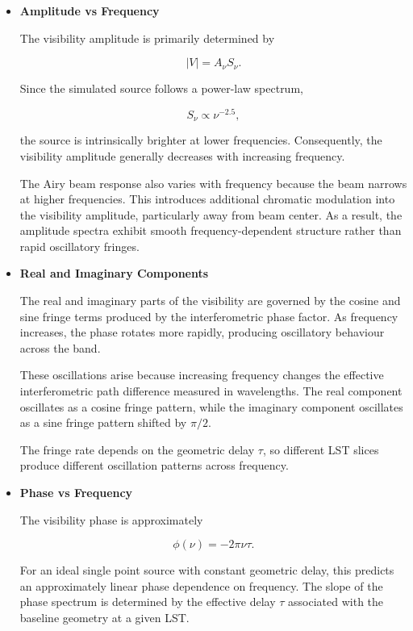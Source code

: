 \documentclass{article}
\begin{document}
\begin{itemize}

\item \textbf{Amplitude vs Frequency}

The visibility amplitude is primarily determined by

\[
|V| = A_\nu S_\nu.
\]

Since the simulated source follows a power-law spectrum,

\[
S_\nu \propto \nu^{-2.5},
\]

the source is intrinsically brighter at lower frequencies. Consequently, the visibility amplitude generally decreases with increasing frequency.

The Airy beam response also varies with frequency because the beam narrows at higher frequencies. This introduces additional chromatic modulation into the visibility amplitude, particularly away from beam center. As a result, the amplitude spectra exhibit smooth frequency-dependent structure rather than rapid oscillatory fringes.

\item \textbf{Real and Imaginary Components}

The real and imaginary parts of the visibility are governed by the cosine and sine fringe terms produced by the interferometric phase factor. As frequency increases, the phase rotates more rapidly, producing oscillatory behaviour across the band.

These oscillations arise because increasing frequency changes the effective interferometric path difference measured in wavelengths. The real component oscillates as a cosine fringe pattern, while the imaginary component oscillates as a sine fringe pattern shifted by $\pi/2$.

The fringe rate depends on the geometric delay $\tau$, so different LST slices produce different oscillation patterns across frequency.

\item \textbf{Phase vs Frequency}

The visibility phase is approximately

\begin{equation}
\phi(\nu)
=
-2\pi\nu\tau.
\end{equation}

For an ideal single point source with constant geometric delay, this predicts an approximately linear phase dependence on frequency. The slope of the phase spectrum is determined by the effective delay $\tau$ associated with the baseline geometry at a given LST.


\end{itemize}
\end{document}
